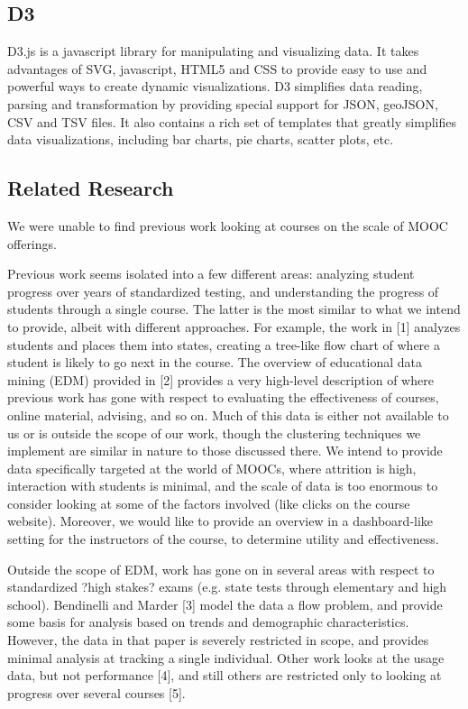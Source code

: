 
\subsection{D3}
D3.js is a javascript library for manipulating and visualizing data. It takes advantages of SVG, javascript, HTML5 and CSS to provide easy to use and powerful ways to create dynamic visualizations. D3 simplifies data reading, parsing and transformation by providing special support for JSON, geoJSON, CSV and TSV files. It also contains a rich set of templates that greatly simplifies data visualizations, including bar charts, pie charts, scatter plots, etc.

\subsection{Related Research}
We were unable to find previous work looking at courses on the scale of MOOC offerings. 

Previous work seems isolated into a few different areas: analyzing student progress over years of standardized testing, and understanding the progress of students through a single course. The latter is the most similar to what we intend to provide, albeit with different approaches. For example, the work in [1] analyzes students and places them into states, creating a tree-like flow chart of where a student is likely to go next in the course. The overview of educational data mining (EDM) provided in [2] provides a very high-level description of where previous work has gone with respect to evaluating the effectiveness of courses, online material, advising, and so on. Much of this data is either not available to us or is outside the scope of our work, though the clustering techniques we implement are similar in nature to those discussed there. We intend to provide data specifically targeted at the world of MOOCs, where attrition is high, interaction with students is minimal, and the scale of data is too enormous to consider looking at some of the factors involved (like clicks on the course website). Moreover, we would like to provide an overview in a dashboard-like setting for the instructors of the course, to determine utility and effectiveness. 

Outside the scope of EDM, work has gone on in several areas with respect to standardized ?high stakes? exams (e.g. state tests through elementary and high school). Bendinelli and Marder [3] model the data a flow problem, and provide some basis for analysis based on trends and demographic characteristics. However, the data in that paper is severely restricted in scope, and provides minimal analysis at tracking a single individual. Other work looks at the usage data, but not performance [4], and still others are restricted only to looking at progress over several courses [5].
